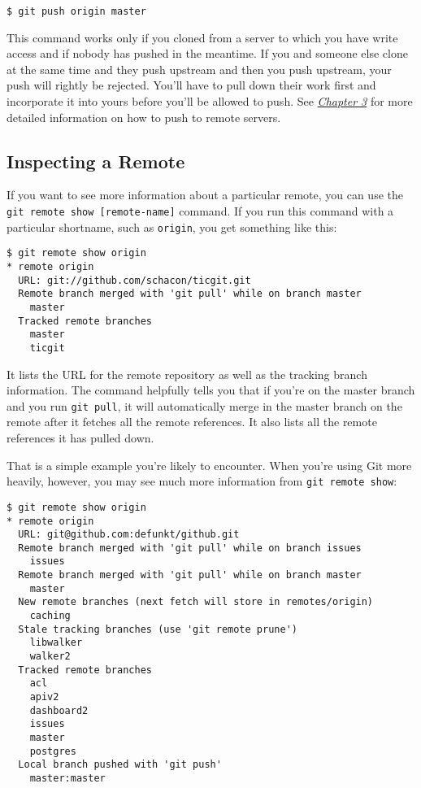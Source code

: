 \documentclass[a4paper]{book}
\newcommand{\prechap}{Chapter }
\newcommand{\postchap}{}
\newcommand{\chapref}[1]{\hyperref[chap:#1]{\prechap #1\postchap}}
\begin{document}
\begin{shaded}\begin{verbatim}
$ git push origin master
\end{verbatim}\end{shaded}

This command works only if you cloned from a server to which you have write access and if nobody has pushed in the meantime. If you and someone else clone at the same time and they push upstream and then you push upstream, your push will rightly be rejected. You'll have to pull down their work first and incorporate it into yours before you'll be allowed to push. See \emph{\chapref{3}} for more detailed information on how to push to remote servers.

\subsection{Inspecting a Remote}

If you want to see more information about a particular remote, you can use the \texttt{git remote show {[}remote-name{]}} command. If you run this command with a particular shortname, such as \texttt{origin}, you get something like this:

\begin{shaded}\begin{verbatim}
$ git remote show origin
* remote origin
  URL: git://github.com/schacon/ticgit.git
  Remote branch merged with 'git pull' while on branch master
    master
  Tracked remote branches
    master
    ticgit
\end{verbatim}\end{shaded}

It lists the URL for the remote repository as well as the tracking branch information. The command helpfully tells you that if you're on the master branch and you run \texttt{git pull}, it will automatically merge in the master branch on the remote after it fetches all the remote references. It also lists all the remote references it has pulled down.

That is a simple example you're likely to encounter. When you're using Git more heavily, however, you may see much more information from \texttt{git remote show}:

\begin{shaded}\begin{verbatim}
$ git remote show origin
* remote origin
  URL: git@github.com:defunkt/github.git
  Remote branch merged with 'git pull' while on branch issues
    issues
  Remote branch merged with 'git pull' while on branch master
    master
  New remote branches (next fetch will store in remotes/origin)
    caching
  Stale tracking branches (use 'git remote prune')
    libwalker
    walker2
  Tracked remote branches
    acl
    apiv2
    dashboard2
    issues
    master
    postgres
  Local branch pushed with 'git push'
    master:master
\end{verbatim}\end{shaded}
\end{document}
